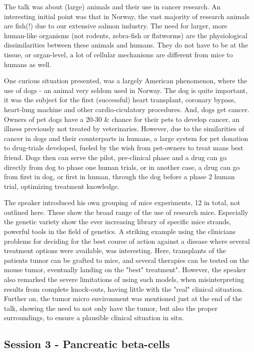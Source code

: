 \documentclass[12p]{article}
\begin{document}
The talk was about (large) animals and their use in cancer research.
An interesting initial point was that in Norway, the vast majority of research animals are fish(!) due to our extensive salmon industry.
The need for larger, more human-like organisms (not rodents, zebra-fish or flatworms) are the physiological dissimilarities between these animals and humans.
They do not have to be at the tissue, or organ-level, a lot of cellular mechanisms are different from mice to humans as well.

One curious situation presented, was a largely American phenomenon, where the use of dogs - an animal very seldom used in Norway.
The dog is quite important, it was the subject for the first (successful) heart transplant, coronary bypass, heart-lung machine and other cardio-ciculatory procedures.
And, dogs get cancer.
Owners of pet dogs have a 20-30 \& chance for their pets to develop cancer, an illness previously not treated by veterinaries.
However, due to the similarities of cancer in dogs and their counterparts in humans, a large system for pet donation to drug-trials developed, fueled by the wish from pet-owners to treat mans best friend.
Dogs then can serve the pilot, pre-clinical phase and a drug can go directly from dog to phase one human trials, or in another case, a drug can go from first in dog, or first in human, through the dog before a phase 2 human trial, optimizing treatment knowledge.

The speaker introduced his own grouping of mice experiments, 12 in total, not outlined here.
These show the broad range of the use of research mice.
Especially the genetic variety show the ever increasing library of specific mice strands, powerful tools in the field of genetics.
A striking example using the clinicians problems for deciding for the best course of action against a disease where several treatment options were available, was interesting.
Here, transplants of the patients tumor can be grafted to mice, and several therapies can be tested on the mouse tumor, eventually landing on the "best" treatment".
However, the speaker also remarked the severe limitations of using such models, when misinterpreting results from complete knock-outs, having little with the "real" clinical situation.
Further on, the tumor micro environment was mentioned just at the end of the talk, showing the need to not only have the tumor, but also the proper surroundings, to ensure a plausible clinical situation in situ.

\subsection*{Session 3 - Pancreatic beta-cells}
\end{document}
